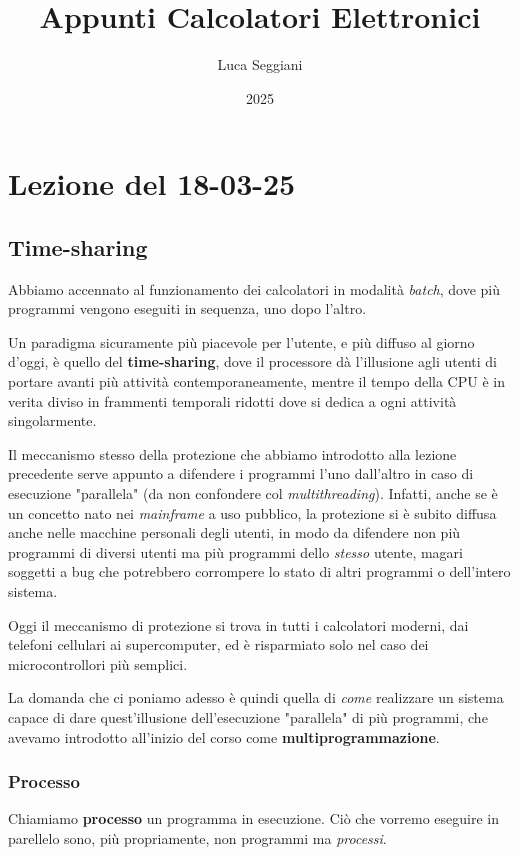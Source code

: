 \documentclass[a4paper,11pt]{article}
\title{Appunti Calcolatori Elettronici}
\author{Luca Seggiani}
\date{2025}
\begin{document}
\section{Lezione del 18-03-25}

\thispagestyle{empty}
\pagestyle{fancy}

\subsection{Time-sharing}
Abbiamo accennato al funzionamento dei calcolatori in modalità \textit{batch}, dove più programmi vengono eseguiti in sequenza, uno dopo l'altro.

Un paradigma sicuramente più piacevole per l'utente, e più diffuso al giorno d'oggi, è quello del \textbf{time-sharing}, dove il processore dà l'illusione agli utenti di portare avanti più attività contemporaneamente, mentre il tempo della CPU è in verita diviso in frammenti temporali ridotti dove si dedica a ogni attività singolarmente.

Il meccanismo stesso della protezione che abbiamo introdotto alla lezione precedente serve appunto a difendere i programmi l'uno dall'altro in caso di esecuzione "parallela" (da non confondere col \textit{multithreading}).
Infatti, anche se è un concetto nato nei \textit{mainframe} a uso pubblico, la protezione si è subito diffusa anche nelle macchine personali degli utenti, in modo da difendere non più programmi di diversi utenti ma più programmi dello \textit{stesso} utente, magari soggetti a bug che potrebbero corrompere lo stato di altri programmi o dell'intero sistema.

Oggi il meccanismo di protezione si trova in tutti i calcolatori moderni, dai telefoni cellulari ai supercomputer, ed è risparmiato solo nel caso dei microcontrollori più semplici.

La domanda che ci poniamo adesso è quindi quella di \textit{come} realizzare un sistema capace di dare quest'illusione dell'esecuzione "parallela" di più programmi, che avevamo introdotto all'inizio del corso come \textbf{multiprogrammazione}.

\subsubsection{Processo}
Chiamiamo \textbf{processo} un programma in esecuzione. Ciò che vorremo eseguire in parellelo sono, più propriamente, non programmi ma \textit{processi}.
\end{document}
